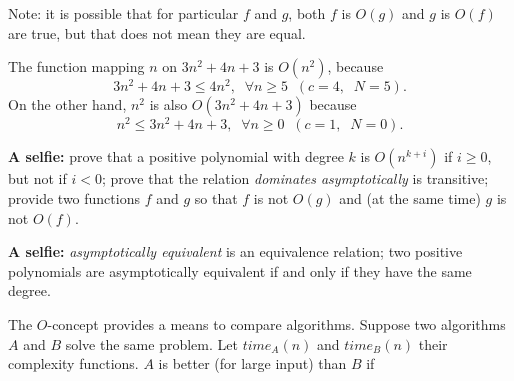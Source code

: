 
 

Note: it is possible that for particular $f$ and $g$, both $f$ is
$O(g)$ and $g$ is $O(f)$ are true, but that does not mean they are
equal.

\begin{vb}{
The function mapping $n$ on $3n^2+4n +3$ is $O(n^2)$, because
\[ 3 n^2+4n +3 \leq 4 n^2,\;\; \forall n\geq 5 \;\;(c=4,\;\;N=5).\]
On the other hand, $n^2$ is also $O(3n^2+4n +3)$ because
\[ n^2 \leq 3 n^2+4n+3,\;\; \forall n\geq 0 \;\; (c=1,\;\; N=0). \]
}
\end{vb}

{\bf A selfie:} prove that a positive polynomial with degree $k$ is
$O(n^{k+i})$ if $i \geq 0$, but not if $i < 0$; prove that the
relation {\em dominates asymptotically} is transitive; provide two
functions $f$ and $g$ so that $f$ is not $O(g)$ and (at the same time)
$g$ is not $O(f)$.






{\bf A selfie:} {\em asymptotically equivalent} is an equivalence
relation; two positive polynomials are asymptotically equivalent if
and only if they have the same degree.



The $O$-concept provides a means to compare algorithms. Suppose two
algorithms $A$ and $B$ solve the same problem. Let $time_A(n)$ and
$time_B(n)$ their complexity functions. $A$ is better (for large
input) than $B$ if 

